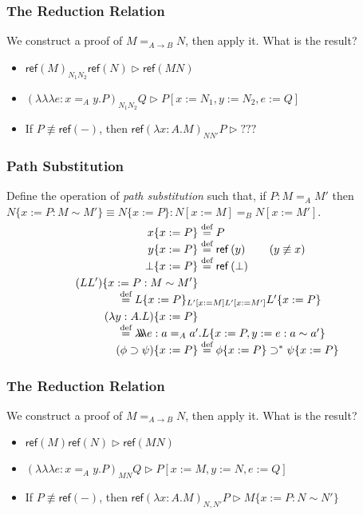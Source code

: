 \documentclass[handout]{beamer}
\newcommand{\eqdef}{\mathrel{\smash{\stackrel{\text{def}}{=}}}}
\newcommand{\reff}[1]{\ensuremath{\mathsf{ref} \left( {#1} \right)}}
\newcommand{\triplelambda}{\ensuremath{\lambda \!\! \lambda \!\! \lambda}}
\begin{document}
\begin{frame}[fragile]
\frametitle{The Reduction Relation}
We construct a proof of $M =_{A \rightarrow B} N$, then apply it.  What is the result?
\begin{itemize}[<+->]
\item
$\reff{M}_{N_1N_2} \reff{N} \rhd \reff{MN}$
\item
$(\triplelambda e:x =_A y. P)_{N_1N_2}Q \rhd P[x:=N_1, y:=N_2, e:=Q]$
\item
If $P \not\equiv \reff{-}$, then $\reff{\lambda x:A.M}_{NN'} P \rhd ???$
\end{itemize}

\end{frame}

\begin{frame}[fragile]
\frametitle{Path Substitution}
Define the operation of \emph{path substitution} such that,
if $P : M =_A M'$ then $N \{ x := P : M \sim M' \} \equiv N \{ x:= P \} : N [x := M ]=_B N [x := M']$.
\begin{align*}
x \{ x := P \} & \eqdef P \\
y \{ x := P \} & \eqdef \reff{y} \qquad (y \not\equiv x) \\
\bot \{ x := P \} & \eqdef \reff{\bot} \\
(LL') \{ x := P : M \sim M' \} \\
\omit\rlap{\qquad \qquad $\eqdef L \{ x := P \}_{L' [x := M] L' [x := M']} L' \{ x := P \}$} \\
(\lambda y:A.L) \{ x := P \} & \\
\omit\rlap{\qquad\qquad $\eqdef \triplelambda e : a =_A a' . L \{ x := P , y := e : a \sim a' \}$} \\
(\phi \supset \psi) \{ x := P \} & \eqdef \phi \{ x := P \} \supset^* \psi \{ x := P \}
\end{align*}
\end{frame}

\begin{frame}[fragile]
\frametitle{The Reduction Relation}
We construct a proof of $M =_{A \rightarrow B} N$, then apply it.  What is the result?
\begin{itemize}
\item
$\reff{M} \reff{N} \rhd \reff{MN}$
\item
$(\triplelambda e:x =_A y. P)_{MN}Q \rhd P[x:=M, y:=N, e:=Q]$
\item
If $P \not\equiv \reff{-}$, then $\reff{\lambda x:A.M}_{N,N'} P \rhd M \{ x := P : N ∼ N' \}$
\end{itemize}
\end{frame}
\end{document}
